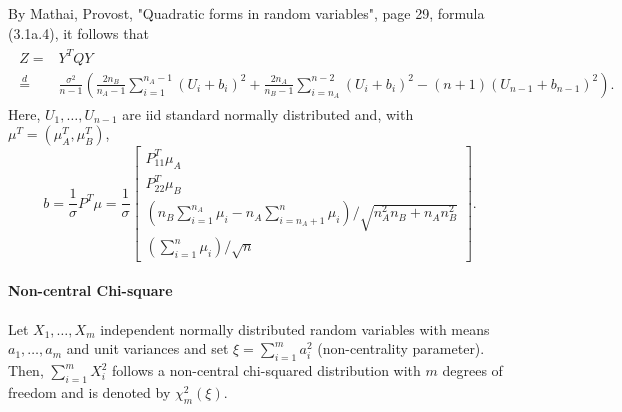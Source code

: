 \documentclass{article}
\theoremstyle{definition}
\theoremstyle{remark}
\newcommand{\eqdis}{\stackrel{d}{=}}
\begin{document}
By Mathai, Provost, "Quadratic forms in random variables", page 29, formula (3.1a.4), it follows that
\begin{align}
	\begin{split}\label{eq:Z_law}
		Z = &Y^T Q Y \\
		\eqdis &\frac{\sigma^2}{n-1} \left(
		\frac{2 n_B}{n_A -1} \sum_{i=1}^{n_A - 1} (U_i + b_i)^2
		+ \frac{2 n_A}{n_B -1} \sum_{i= n_A}^{n -2} (U_i + b_i)^2
		- (n+1) (U_{n-1} + b_{n-1})^2
		\right).
	\end{split}
\end{align}
Here, $U_1, \dots, U_{n-1}$ are iid standard normally distributed and, with $\mu^T = (\mu_A^T, \mu_B^T)$,
$$
	b = \frac{1}{\sigma}P^T \mu =
	\frac{1}{\sigma}\begin{bmatrix}
		P_{11}^T \mu_A                                                                                      \\
		P_{22}^T \mu_B                                                                                      \\
		\left(n_B \sum_{i=1}^{n_A} \mu_i - n_A \sum_{i=n_A + 1}^n \mu_i\right)/\sqrt{n_A^2 n_B + n_A n_B^2} \\
		\left(\sum_{i=1}^n \mu_i \right)/\sqrt{n}
	\end{bmatrix}.
$$
\paragraph{Non-central Chi-square}
Let $X_1, \dots, X_m$ independent normally distributed random variables with means $a_1, \dots, a_m$ and unit variances and set $\xi = \sum_{i=1}^m a_i^2$ (non-centrality parameter). Then, $\sum_{i = 1}^m X_i^2$ follows a non-central chi-squared distribution with $m$ degrees of freedom and is denoted by $\chi^2_m(\xi)$.
\end{document}
